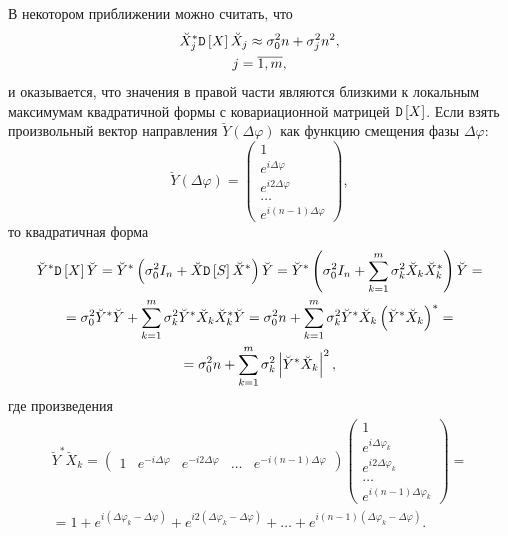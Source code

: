 В некотором приближении можно считать, что
\begin{gather*}
    \breve{X}_j^* \mathtt{D} \left [ X \right ] \breve{X}_j \approx \sigma_0^2 n + \sigma_j^2 n^2 , \\
    j = \overline{1,m} ,
\end{gather*}
и оказывается, что значения в правой части являются близкими к локальным максимумам квадратичной формы с
ковариационной матрицей $\mathtt{D} \left [ X \right ]$. Если взять произвольный вектор направления $\breve{Y}(\Delta \varphi)$ как функцию смещения фазы $\Delta \varphi$:
\[
    \breve{Y}(\Delta \varphi) =
    \begin{pmatrix}
        1                      \\
        e^{i \Delta \varphi}   \\
        e^{i 2 \Delta \varphi} \\
        \dots                  \\
        e^{i (n-1) \Delta \varphi}
    \end{pmatrix} ,
\]
то квадратичная форма
\begin{multline}
    \label{jammers:multiple:quadric}
    \breve{Y}^* \mathtt{D} \left [ X \right ] \breve{Y}
    = \breve{Y}^* \left ( \sigma_0^2 I_n + \breve{X} \mathtt{D} \left [ S \right ] \breve{X}^* \right ) \breve{Y}
    = \breve{Y}^* \left ( \sigma_0^2 I_n + \sum_{k=1}^m \sigma_k^2 \breve{X}_k \breve{X}_k^* \right ) \breve{Y} = \\
    = \sigma_0^2 \breve{Y}^* \breve{Y} + \sum_{k=1}^m \sigma_k^2 \breve{Y}^* \breve{X}_k \breve{X}_k^* \breve{Y}
    = \sigma_0^2 n + \sum_{k=1}^m \sigma_k^2 \breve{Y}^* \breve{X}_k \left ( \breve{Y}^* \breve{X}_k \right )^* = \\
    = \sigma_0^2 n + \sum_{k=1}^m \sigma_k^2 \left | \breve{Y}^* \breve{X}_k \right |^2 ,
\end{multline}
где произведения
\begin{multline*}
    \breve{Y}^* \breve{X}_k
    =
    \begin{pmatrix}
        1                       &
        e^{- i \Delta \varphi}   &
        e^{- i 2 \Delta \varphi} &
        \dots                   &
        e^{- i (n-1) \Delta \varphi}
    \end{pmatrix}
    \begin{pmatrix}
        1                        \\
        e^{i \Delta \varphi_k}   \\
        e^{i 2 \Delta \varphi_k} \\
        \dots                    \\
        e^{i (n-1) \Delta \varphi_k}
    \end{pmatrix}
    = \\
    = 1 + e^{i (\Delta \varphi_k - \Delta \varphi )} + e^{i 2 (\Delta \varphi_k - \Delta \varphi )} + \dots + e^{i (n-1) (\Delta \varphi_k - \Delta \varphi )} .
\end{multline*}
